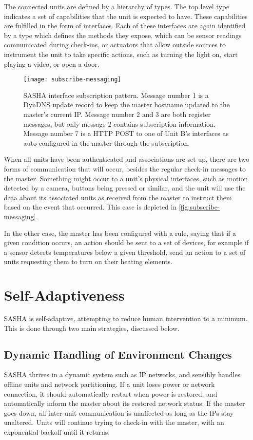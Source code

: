 The connected units are defined by a hierarchy of types. The top level type indicates a set of capabilities that the unit is expected to have. These capabilities are fulfilled in the form of interfaces. Each of these interfaces are again identified by a type which defines the methods they expose, which can be sensor readings communicated during check-ins, or actuators that allow outside sources to instrument the unit to take specific actions, such as turning the light on, start playing a video, or open a door.

\begin{figure}[ht!]
    \centering
    \texttt{[image: subscribe-messaging]}
    \caption{SASHA interface subscription pattern. Message number 1 is a DynDNS update record to keep the master hostname updated to the master's current IP. Message number 2 and 3 are both register messages, but only message 2 contains subscription information. Message number 7 is a HTTP POST to one of Unit B's interfaces as auto-configured in the master through the subscription.}
    \label{fig:subscribe-messaging}
\end{figure}

When all units have been authenticated and associations are set up, there are two forms of communication that will occur, besides the regular check-in messages to the master. Something might occur to a unit's physical interfaces, such as motion detected by a camera, buttons being pressed or similar, and the unit will use the data about its associated units as received from the master to instruct them based on the event that occurred. This case is depicted in \autoref{fig:subscribe-messaging}.

In the other case, the master has been configured with a rule, saying that if a given condition occurs, an action should be sent to a set of devices, for example if a sensor detects temperatures below a given threshold, send an action to a set of units requesting them to turn on their heating elements.


\section{Self-Adaptiveness}
SASHA is self-adaptive, attempting to reduce human intervention to a minimum. This is done through two main strategies, discussed below.

\subsection{Dynamic Handling of Environment Changes}
SASHA thrives in a dynamic system such as IP networks, and sensibly handles offline units and network partitioning. If a unit loses power or network connection, it should automatically restart when power is restored, and automatically inform the master about its restored network status. If the master goes down, all inter-unit communication is unaffected as long as the IPs stay unaltered. Units will continue trying to check-in with the master, with an exponential backoff until it returns.

